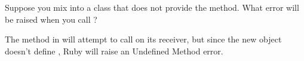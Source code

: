 \begin{checkyourself}
  Suppose you mix  into a class  that does not
  provide the  method.  What error will be raised when you
  call ?
  \begin{answer}
  The  method in  will attempt to call  on its receiver,
  but since the new  object doesn't define , Ruby will raise an
  Undefined Method error.
  \end{answer}
\end{checkyourself}
